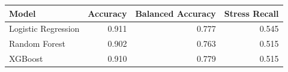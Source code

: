 \begin{tabular}{lrrr}
\toprule
Model & Accuracy & Balanced Accuracy & Stress Recall \\
\midrule
Logistic Regression & 0.911 & 0.777 & 0.545 \\
Random Forest & 0.902 & 0.763 & 0.515 \\
XGBoost & 0.910 & 0.779 & 0.515 \\
\bottomrule
\end{tabular}
